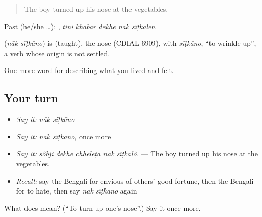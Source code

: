 \begin{quote}
The boy turned up his nose at the vegetables.
\end{quote}

Past (he/she …):     , \emph{tini khābār dekhe nāk sĩṭkālen}.

\begin{cousinweb}
\textbf{ } (\emph{nāk sĩṭkāno}) is  (taught), the nose (CDIAL 6909), with \emph{sĩṭkāno}, \textquotedblleft{}to wrinkle up\textquotedblright{}, a verb whose origin is not settled.
\end{cousinweb}

\begin{grammarlens}[title={What you've built}]
One more word for describing what you lived and felt.
\end{grammarlens}

\subsection*{Your turn}
\begin{itemize}
\raggedright
  \item \emph{Say it:} \emph{nāk sĩṭkāno}
  \item \emph{Say it:} \emph{nāk sĩṭkāno}, once more
  \item \emph{Say it:} \emph{sôbji dekhe chheleṭā nāk sĩṭkālô.} — The boy turned up his nose at the vegetables.
  \item \emph{Recall:} say the Bengali for envious of others' good fortune, then the Bengali for to hate, then say \emph{nāk sĩṭkāno} again
\end{itemize}

\begin{tcolorbox}[breakable,colback=teal!4,colframe=teal!35!black,title={Before you move on}]
What does   mean? (\textquotedblleft{}To turn up one's nose\textquotedblright{}.) Say it once more.
\end{tcolorbox}
